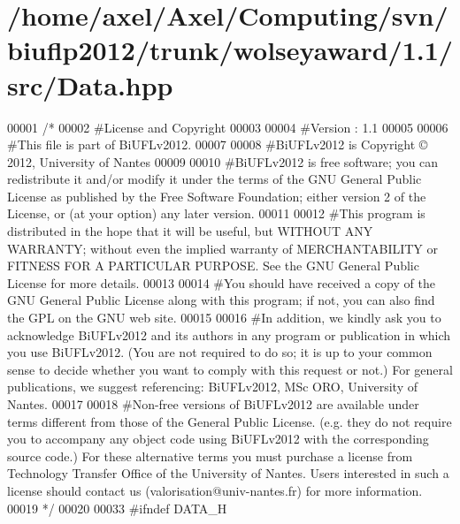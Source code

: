 \hypertarget{Data_8hpp_source}{\section{/home/axel/\-Axel/\-Computing/svn/biuflp2012/trunk/wolseyaward/1.1/src/\-Data.hpp}
}

\begin{DoxyCode}
00001 \textcolor{comment}{/*}
00002 \textcolor{comment}{ #License and Copyright}
00003 \textcolor{comment}{ }
00004 \textcolor{comment}{ #Version : 1.1}
00005 \textcolor{comment}{ }
00006 \textcolor{comment}{ #This file is part of BiUFLv2012.}
00007 \textcolor{comment}{ }
00008 \textcolor{comment}{ #BiUFLv2012 is Copyright © 2012, University of Nantes}
00009 \textcolor{comment}{ }
00010 \textcolor{comment}{ #BiUFLv2012 is free software; you can redistribute it and/or modify it under
       the terms of the GNU General Public License as published by the Free Software
       Foundation; either version 2 of the License, or (at your option) any later version.}
00011 \textcolor{comment}{ }
00012 \textcolor{comment}{ #This program is distributed in the hope that it will be useful, but WITHOUT
       ANY WARRANTY; without even the implied warranty of MERCHANTABILITY or FITNESS FOR
       A PARTICULAR PURPOSE. See the GNU General Public License for more details.}
00013 \textcolor{comment}{ }
00014 \textcolor{comment}{ #You should have received a copy of the GNU General Public License along with
       this program; if not, you can also find the GPL on the GNU web site.}
00015 \textcolor{comment}{ }
00016 \textcolor{comment}{ #In addition, we kindly ask you to acknowledge BiUFLv2012 and its authors in
       any program or publication in which you use BiUFLv2012. (You are not required to
       do so; it is up to your common sense to decide whether you want to comply with
       this request or not.) For general publications, we suggest referencing: 
       BiUFLv2012, MSc ORO, University of Nantes.}
00017 \textcolor{comment}{ }
00018 \textcolor{comment}{ #Non-free versions of BiUFLv2012 are available under terms different from
       those of the General Public License. (e.g. they do not require you to accompany any
       object code using BiUFLv2012 with the corresponding source code.) For these
       alternative terms you must purchase a license from Technology Transfer Office of the
       University of Nantes. Users interested in such a license should contact us
       (valorisation@univ-nantes.fr) for more information.}
00019 \textcolor{comment}{ */}
00020 
00033 \textcolor{preprocessor}{#ifndef DATA\_H}

\end{DoxyCode}
